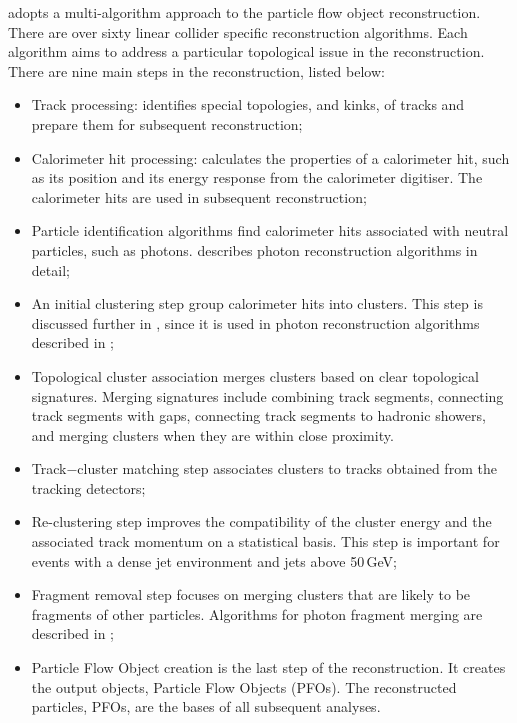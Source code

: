 
\pandora adopts a multi-algorithm approach to the particle flow object reconstruction. There are over sixty \ee linear collider specific reconstruction algorithms. Each algorithm aims to address a particular topological issue in the reconstruction. There are nine main steps in the \pandora reconstruction, listed below:
\begin{itemize}
  \item Track processing:  identifies special topologies,  and kinks, of tracks and prepare them for subsequent reconstruction;
  \item Calorimeter hit processing: calculates the properties of a calorimeter hit, such  as its position and its energy response from the calorimeter digitiser. The calorimeter hits are used in subsequent reconstruction;
  \item Particle identification algorithms find calorimeter hits associated with neutral particles, such as photons.  describes photon reconstruction  algorithms in detail;
  \item An initial clustering step group calorimeter hits into clusters. This step is discussed further in , since it is used in photon reconstruction  algorithms described in ;
  \item Topological cluster association merges clusters based on clear topological signatures. Merging signatures include combining track segments, connecting track segments with gaps, connecting track segments to hadronic showers, and merging clusters when they are within close proximity.
  \item Track$-$cluster  matching step associates clusters to tracks obtained from the tracking detectors;
  \item Re-clustering step  improves the compatibility of the cluster energy and the associated track momentum on a statistical basis. This step is important for events with a dense jet environment and jets above 50\,GeV;
  \item Fragment removal step  focuses on merging clusters that are likely to be fragments of other particles. Algorithms for photon fragment merging  are described in ;
  \item Particle Flow Object creation is the last step of the \pandora reconstruction. It creates the output objects, Particle Flow Objects (PFOs). The reconstructed particles, PFOs, are the bases of all subsequent analyses.

\end{itemize}

